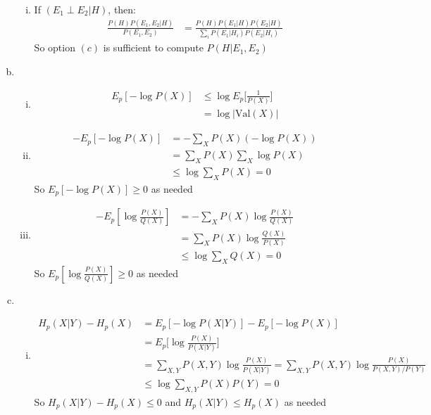 \documentclass{article}
\begin{document}
\begin{enumerate}[(a)]
\begin{enumerate}[(i)]
        \item If $(E_1 \perp E_2 | H)$, then: \begin{align*}
            \frac{P(H)P(E_1, E_2 | H)}{P(E_1, E_2)} &= \frac{P(H)P(E_1|H) P(E_2 | H)}{\sum_{i}P(E_1|H_i)P(E_2|H_i)}
        \end{align*}
        So option $(c)$ is sufficient to compute $P(H|E_1, E_2)$
    \end{enumerate}
    \item \begin{enumerate}[(i)]
        \item \begin{align*}
            E_p[-\log P(X)] &\leq \log E_p \bigg[ \frac{1}{P(X)} \bigg] \\[0.5ex]
            &= \log |\text{Val}(X)|
        \end{align*}
        \item \begin{align*}
            - E_p[- \log P(X)] &= - \sum_{X} P(X) (-\log P(X)) \\
            &= \sum_{X} P(X) \sum_{X} \log P(X) \\
            &\leq \log \sum_{X} P(X) = 0
        \end{align*}
        So $E_p[- \log P(X)] \geq 0$ as needed 
        \item \begin{align*}
            - E_p[\log \frac{P(X)}{Q(X)}] &= - \sum_X P(X) \log \frac{P(X)}{Q(X)} \\
            &= \sum_X P(X) \log \frac{Q(X)}{P(X)} \\
            &\leq \log \sum_X Q(X) = 0
        \end{align*}
        So $E_p[\log \frac{P(X)}{Q(X)}] \geq 0$ as needed 
    \end{enumerate}
    \item \begin{enumerate}[(i)]
        \item \begin{align*}
            H_p(X|Y) - H_p(X) &= E_p[-\log P(X|Y)] - E_p[-\log P(X)] \\ 
            &= E_p\bigg[\log \frac{P(X)}{P(X|Y)}\bigg] \\
            &= \sum_{X, Y} P(X, Y) \log \frac{P(X)}{P(X|Y)} = \sum_{X, Y} P(X, Y) \log \frac{P(X)}{P(X, Y)/P(Y)}\\
            &\leq \log \sum_{X,Y} P(X)P(Y) = 0
        \end{align*}
        So $H_p(X|Y) - H_p(X) \leq 0$ and $H_p(X|Y) \leq H_p(X)$ as needed 

\end{enumerate}
\end{enumerate}
\end{document}
